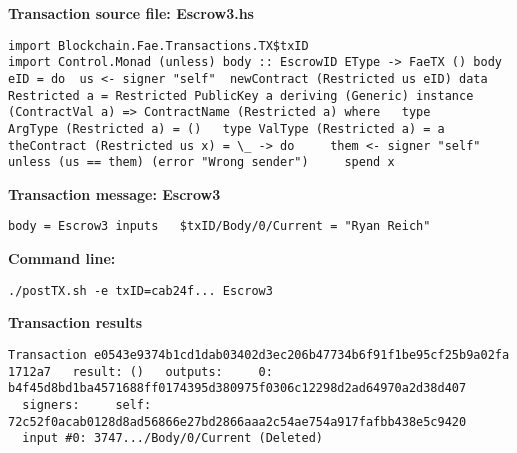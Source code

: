 \documentclass[11pt]{article}
\newcommand{\codeblock}[1]{\begin{mdframed}[
    backgroundcolor=header-color,
    linecolor=header-color,
    innertopmargin=10pt,
    ]{\texttt{#1}}\end{mdframed}}
\begin{document}

\vspace{11pt}

\textbf{Transaction source file: Escrow3.hs}

\codeblock{import Blockchain.Fae.Transactions.TX\$txID\newline
import Control.Monad (unless)\newline
\newline
body :: EscrowID EType -\textgreater{} FaeTX ()\newline
body eID = do\newline
 us \textless{}- signer "self"\newline
 newContract (Restricted us eID)\newline
\newline
data Restricted a = Restricted PublicKey a deriving (Generic)\newline
\newline
instance (ContractVal a) =\textgreater{} ContractName (Restricted a) where\newline
  type ArgType (Restricted a) = ()\newline
  type ValType (Restricted a) = a\newline
  theContract (Restricted us x) = \textbackslash{}\_ -\textgreater{} do\newline
    them \textless{}- signer "self"\newline
    unless (us == them) (error "Wrong sender")\newline
    spend x}

\textbf{Transaction message: Escrow3}

\codeblock{body = Escrow3\newline
inputs\newline
  \$txID\slash{}Body\slash{}0\slash{}Current = "Ryan Reich"}

\textbf{Command line:}

\codeblock{.\slash{}postTX.sh -e txID=cab24f... Escrow3}

\textbf{Transaction results}

\codeblock{Transaction e0543e9374b1cd1dab03402d3ec206b47734b6f91f1be95cf25b9a02fa1712a7\newline
  result: ()\newline
  outputs:\newline
    0: b4f45d8bd1ba4571688ff0174395d380975f0306c12298d2ad64970a2d38d407\newline
  signers:\newline
    self: 72c52f0acab0128d8ad56866e27bd2866aaa2c54ae754a917fafbb438e5c9420\newline
  input \#0: 3747...\slash{}Body\slash{}0\slash{}Current (Deleted)}
\end{document}
